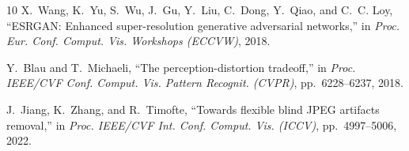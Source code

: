 \documentclass[conference]{IEEEtran}
\begin{document}
\begin{thebibliography}{10}
X.~Wang, K.~Yu, S.~Wu, J.~Gu, Y.~Liu, C.~Dong, Y.~Qiao, and C.~C. Loy, ``ESRGAN: Enhanced super-resolution generative adversarial networks,'' in \emph{Proc. Eur. Conf. Comput. Vis. Workshops (ECCVW)}, 2018.

Y.~Blau and T.~Michaeli, ``The perception-distortion tradeoff,'' in \emph{Proc. IEEE/CVF Conf. Comput. Vis. Pattern Recognit. (CVPR)}, pp.~6228--6237, 2018.

J.~Jiang, K.~Zhang, and R.~Timofte, ``Towards flexible blind JPEG artifacts removal,'' in \emph{Proc. IEEE/CVF Int. Conf. Comput. Vis. (ICCV)}, pp.~4997--5006, 2022.

\end{thebibliography}
\end{document}
